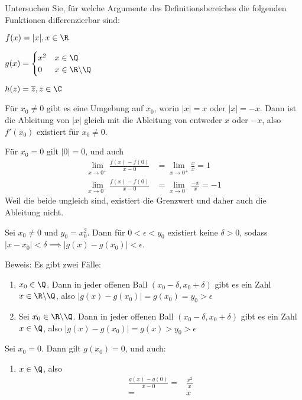 \begin{Problem}
	Untersuchen Sie, für welche Argumente des Definitionsbereiches die folgenden Funktionen differenzierbar sind:
	\begin{parts}
	\item $f(x)=|x|, x\in \R$ 
	\item $g(x)= \begin{cases}
			x^2 & x\in \Q \\
			0 & x\in \R \backslash \Q
	\end{cases}$ 
\item $h(z)=\overline{z}, z\in \C$
	\end{parts}
\end{Problem}

\begin{parts}
\item F\"{u}r $x_0\neq 0$ gibt es eine Umgebung auf $x_0$, worin $|x|=x$ oder $|x|=-x$. Dann ist die Ableitung von $|x|$ gleich mit die Ableitung von entweder $x$ oder $-x$, also $f'(x_0)$ existiert f\"{u}r $x_0\neq 0$.

	F\"{u}r $x_0=0$ gilt $|0|=0$, und auch
	\begin{align*}
		\lim_{x \to 0^{+}} \frac{f(x)-f(0)}{x-0}&=\lim_{x \to 0^{+}} \frac{x}{x}=1\\
		\lim_{x \to 0^{-}} \frac{f(x)-f(0)}{x-0}&=\lim_{x \to 0^{-}} \frac{-x}{x}=-1
	\end{align*}
	Weil die beide ungleich sind, existiert die Grenzwert und daher auch die Ableitung nicht.

\item Sei $x_0\neq 0$ und $y_0=x_0^2$. Dann f\"{u}r $0<\epsilon<y_0$ existiert keine $\delta>0$, sodass $|x-x_0|<\delta\implies |g(x)-g(x_0)|<\epsilon$.

	Beweis: Es gibt zwei F\"{a}lle:
	\begin{enumerate}[label=(\roman*)]
		\item $x_0\in \Q$. Dann in jeder offenen Ball $(x_0-\delta, x_0+\delta)$ gibt es ein Zahl $x \in \R \backslash \Q$, also $|g(x)-g(x_0)|=g(x_0)=y_0>\epsilon$

		\item Sei $x_0\in \R \backslash \Q$. Dann in jeder offenen Ball $(x_0-\delta, x_0+\delta)$ gibt es ein Zahl $x\in \Q$, also $|g(x)-g(x_0)|=g(x)>y_0>\epsilon$
	\end{enumerate}
	Sei $x_0=0$. Dann gilt $g(x_0)=0$, und auch:
	\begin{enumerate}[label=(\roman*)]
		\item $x\in \Q$, also
			\begin{align*}
				\frac{g(x)-g(0)}{x-0}=& \frac{x^2}{x}\\
				=& x
			\end{align*}


\end{enumerate}
\end{parts}
